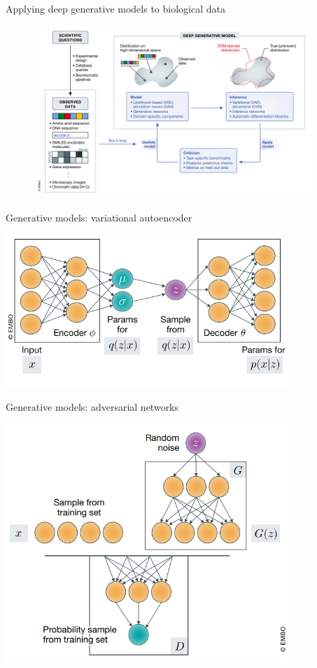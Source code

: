 \documentclass{beamer}					%
\begin{document}
\begin{frame}{Applying deep generative models to biological data}
\begin{figure}
\includegraphics[height=65mm, width=105mm]{dbm}
\end{figure}
\end{frame}

\begin{frame}{Generative models: variational autoencoder}

\begin{center}
\includegraphics[width=0.8\textwidth]{vae}
\end{center}

\end{frame}

\begin{frame}{Generative models: adversarial networks}

\begin{center}
\includegraphics[width=0.8\textwidth]{gan}
\end{center}


\end{frame}
\end{document}
